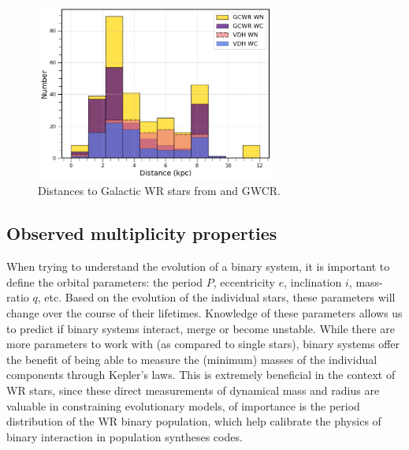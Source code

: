 \begin{figure}
    \centering
    \includegraphics[width=0.7\textwidth]{chapters/introduction/image/dist_dist.png}
    \caption{Distances to Galactic WR stars from  and GWCR.}
    \label{fig:dist_dist}
\end{figure}


\subsection{Observed multiplicity properties}


When trying to understand the evolution of a binary system, it is important to define the orbital parameters: the period $P$, eccentricity $e$, inclination $i$, mass-ratio $q$, etc. Based on the evolution of the individual stars, these parameters will change over the course of their lifetimes. Knowledge of these parameters allows us to predict if binary systems interact, merge or become unstable. While there are more parameters to work with (as compared to single stars), binary systems offer the benefit of being able to measure the (minimum) masses of the individual components through Kepler's laws. This is extremely beneficial in the context of WR stars, since these direct measurements of dynamical mass and radius are valuable in constraining evolutionary models, of importance is the period distribution of the WR binary population, which help calibrate the physics of binary interaction in population syntheses codes.

